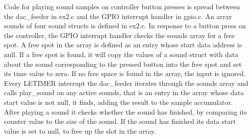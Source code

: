 Code for playing sound samples on controller button presses is spread between
the dac\_feeder in ex2.c and the GPIO interrupt handler in gpio.c. An array
sounds of four sound structs is defined in ex2.c. In response to a button press
on the controller, the GPIO interrupt handler checks the sounds array for a free
spot. A free spot in the array is defined as an entry whose start data address
is null. If a free spot is found, it will copy the values of a sound struct with
data about the sound corresponding to the pressed button into the free spot and
set its time value to zero. If no free space is found in the array, the input is
ignored. Every LETIMER interrupt the dac\_feeder iterates through the sounds
array and calls play\_sound on any active sounds, that is an entry in the array
whose data start value is not null, it finds, adding the result to the sample
accumulator. After playing a sound it checks whether the sound has finished, by
comparing its counter value to the size of the sound. If the sound has finished
its data start value is set to null, to free up the slot in the array.
